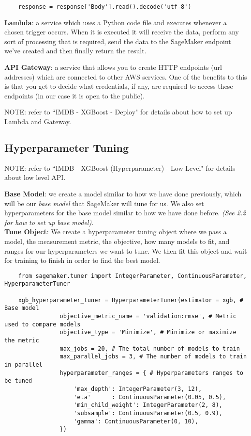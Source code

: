 \documentclass[11pt, a4paper]{article}
\begin{document}
\begin{spacing}{1.1}
\begin{lstlisting}
	response = response['Body'].read().decode('utf-8')                                  
	\end{lstlisting} \vspace*{2mm}
	\textbf{Lambda}: a service which uses a Python code file and executes whenever a chosen trigger occurs. When it is executed it will receive the data, perform any sort of processing that is required, send the data to the SageMaker endpoint we've created and then finally return the result. \newpage

	\noindent \textbf{API Gateway}: a service that allows you to create HTTP endpoints (url addresses) which are connected to other AWS services. One of the benefits to this is that you get to decide what credentials, if any, are required to access these endpoints (in our case it is open to the public).
	\begin{center}
		\color{darkgray} NOTE: refer to ``IMDB - XGBoost - Deploy" for details about how to set up Lambda and Gateway. \color{black}
	\end{center} \vspace*{1mm}

	\subsection{Hyperparameter Tuning}
	\begin{center}
	\color{darkgray} NOTE: refer to ``IMDB - XGBoost (Hyperparameter) - Low Level" for details about low level API. \color{black}
	\end{center} \vspace*{1mm}
	\textbf{Base Model}: we create a model similar to how we have done previously, which will be our \textit{base model} that SageMaker will tune for us. We also set hyperparameters for the base model similar to how we have done before. \textit{(See 2.2 for how to set up base model)}. \vspace*{2mm}\\
	\textbf{Tune Object}: We create a hyperparameter tuning object where we pass a model, the measurement metric, the objective, how many models to fit, and ranges for our hyperparameters we want to tune. We then fit this object and wait for training to finish in order to find the best model. 
	\begin{lstlisting}
	from sagemaker.tuner import IntegerParameter, ContinuousParameter, HyperparameterTuner
	
	xgb_hyperparameter_tuner = HyperparameterTuner(estimator = xgb, # Base model
				objective_metric_name = 'validation:rmse', # Metric used to compare models
				objective_type = 'Minimize', # Minimize or maximize the metric
				max_jobs = 20, # The total number of models to train
				max_parallel_jobs = 3, # The number of models to train in parallel
				hyperparameter_ranges = { # Hyperparameters ranges to be tuned
					'max_depth': IntegerParameter(3, 12),
					'eta'      : ContinuousParameter(0.05, 0.5),
					'min_child_weight': IntegerParameter(2, 8),
					'subsample': ContinuousParameter(0.5, 0.9),
					'gamma': ContinuousParameter(0, 10),
				})
	

\end{lstlisting}
\end{spacing}
\end{document}

